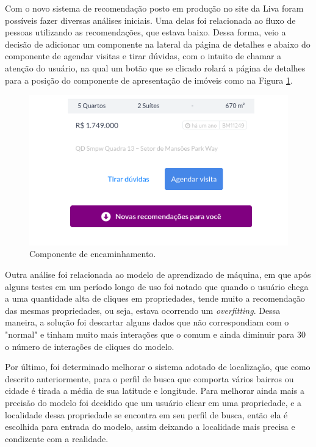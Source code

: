 Com o novo sistema de recomendação posto em produção no site da Liva foram possíveis fazer diversas análises iniciais. Uma delas foi relacionada ao fluxo de pessoas utilizando as recomendações, que estava baixo. Dessa forma, veio a decisão de adicionar um componente na lateral da página de detalhes e abaixo do componente de agendar visitas e tirar dúvidas, com o intuito de chamar a atenção do usuário, na qual um botão que se clicado rolará a página de detalhes para a posição do componente de apresentação de imóveis como na Figura \ref{fig:componente_scroll}.

\begin{figure}[H]
    \centering
    \includegraphics[scale=0.6]{figuras/desenvolvimento/componente_scroll.png}
    \caption[Componente de encaminhamento]{Componente de encaminhamento.}
    \label{fig:componente_scroll}
\end{figure}

Outra análise foi relacionada ao modelo de aprendizado de máquina, em que após alguns testes em um período longo de uso foi notado que quando o usuário chega a uma quantidade alta de cliques em propriedades, tende muito a recomendação das mesmas propriedades, ou seja, estava ocorrendo um \textit{overfitting}. Dessa maneira, a solução foi descartar alguns dados que não correspondiam com o "normal" e tinham muito mais interações  que o comum e ainda diminuir para 30 o número de interações de cliques do modelo.

Por último, foi determinado melhorar o sistema adotado de localização, que como descrito anteriormente, para o perfil de busca que comporta vários bairros ou cidade é tirada a média de sua latitude e longitude. Para melhorar ainda mais a precisão do modelo foi decidido que um usuário clicar em uma propriedade, e a localidade dessa propriedade se encontra em seu perfil de busca, então ela é escolhida para entrada do modelo, assim deixando a localidade mais precisa e condizente com a realidade.

